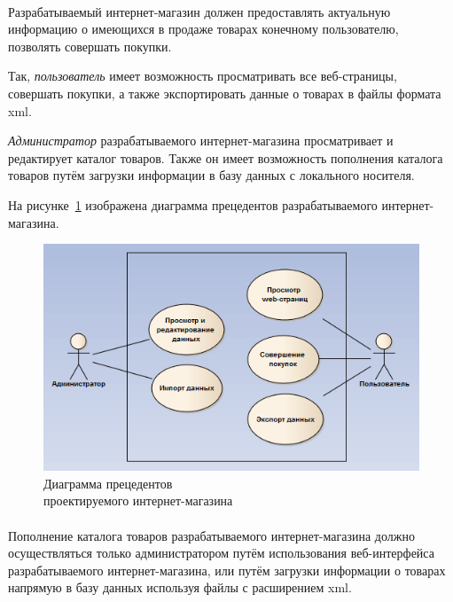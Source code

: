 \paragraph{}
Разрабатываемый интернет-магазин должен предоставлять актуальную информацию о
имеющихся в продаже товарах конечному пользователю, позволять совершать покупки.

Так, \textit{пользователь} имеет возможность просматривать все веб-страницы,
совершать покупки, а также экспортировать данные о товарах в файлы формата xml.

\textit{Администратор} разрабатываемого интернет-магазина просматривает
и редактирует каталог товаров. Также он имеет возможность
пополнения каталога товаров путём загрузки информации в базу данных с
локального носителя.

На рисунке~\ref{fig:use_case} изображена диаграмма прецедентов
разрабатываемого интернет-магазина.

\begin{figure}[h]
  \centering
  \includegraphics[width=130mm]{pic/use_case.png}
  \caption{Диаграмма прецедентов \\ проектируемого интернет-магазина}
  \label{fig:use_case}
\end{figure}

\paragraph{}
Пополнение каталога товаров разрабатываемого интернет-магазина должно осуществляться
только администратором путём использования веб-интерфейса разрабатываемого
интернет-магазина, или путём загрузки информации
о товарах напрямую в базу данных используя файлы с расширением xml.

